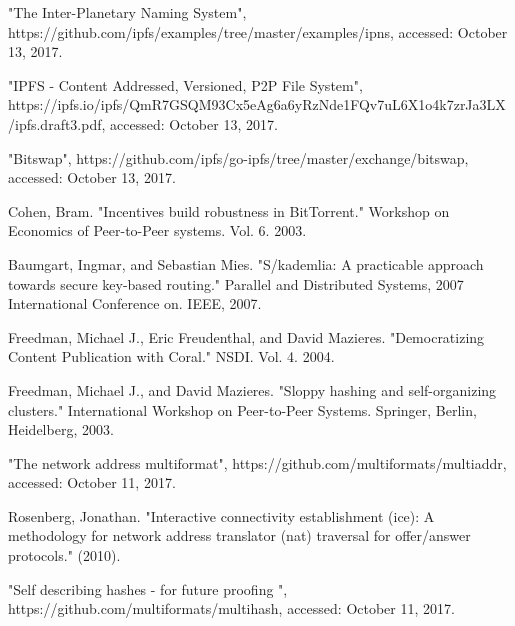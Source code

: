 \documentclass[conference]{IEEEtran}
\begin{document}
%
%
%
\begin{thebibliography}{1}

 "The Inter-Planetary Naming System", https://github.com/ipfs/examples/tree/master/examples/ipns, accessed: October 13, 2017.

 "IPFS - Content Addressed, Versioned, P2P File System", https://ipfs.io/ipfs/QmR7GSQM93Cx5eAg6a6yRzNde1FQv7uL6X1o4k7zrJa3LX/ipfs.draft3.pdf, accessed: October 13, 2017.

 "Bitswap", https://github.com/ipfs/go-ipfs/tree/master/exchange/bitswap, accessed: October 13, 2017.

 Cohen, Bram. "Incentives build robustness in BitTorrent." Workshop on Economics of Peer-to-Peer systems. Vol. 6. 2003.

 Baumgart, Ingmar, and Sebastian Mies. "S/kademlia: A practicable approach towards secure key-based routing." Parallel and Distributed Systems, 2007 International Conference on. IEEE, 2007.

 Freedman, Michael J., Eric Freudenthal, and David Mazieres. "Democratizing Content Publication with Coral." NSDI. Vol. 4. 2004.

 Freedman, Michael J., and David Mazieres. "Sloppy hashing and self-organizing clusters." International Workshop on Peer-to-Peer Systems. Springer, Berlin, Heidelberg, 2003.

 "The network address multiformat", https://github.com/multiformats/multiaddr, accessed: October 11, 2017.

 Rosenberg, Jonathan. "Interactive connectivity establishment (ice): A methodology for network address translator (nat) traversal for offer/answer protocols." (2010).

 "Self describing hashes - for future proofing
", https://github.com/multiformats/multihash, accessed: October 11, 2017.


\end{thebibliography}
\end{document}
